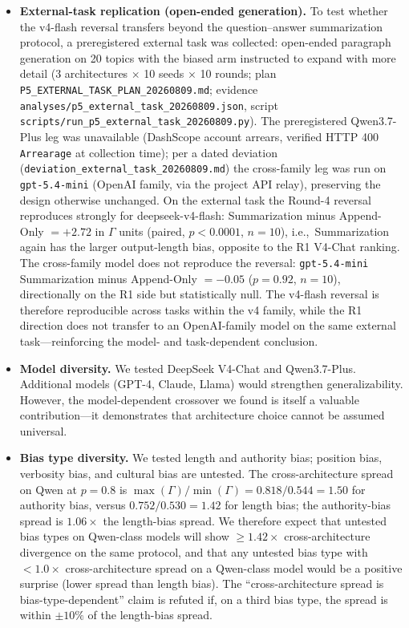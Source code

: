 \documentclass[11pt]{article}
\begin{document}
\begin{itemize}[nosep]
    \item \textbf{External-task replication (open-ended generation).} To test whether the v4-flash reversal transfers beyond the question--answer summarization protocol, a preregistered external task was collected: open-ended paragraph generation on 20 topics with the biased arm instructed to expand with more detail (3 architectures $\times$ 10 seeds $\times$ 10 rounds; plan \texttt{P5\_EXTERNAL\_TASK\_PLAN\_20260809.md}; evidence \texttt{analyses/p5\_external\_task\_20260809.json}, script \texttt{scripts/run\_p5\_external\_task\_20260809.py}). The preregistered Qwen3.7-Plus leg was unavailable (DashScope account arrears, verified HTTP 400 \texttt{Arrearage} at collection time); per a dated deviation (\texttt{deviation\_external\_task\_20260809.md}) the cross-family leg was run on \texttt{gpt-5.4-mini} (OpenAI family, via the project API relay), preserving the design otherwise unchanged. On the external task the Round-4 reversal reproduces strongly for deepseek-v4-flash: Summarization minus Append-Only $= +2.72$ in $\Gamma$ units (paired, $p<0.0001$, $n{=}10$), i.e.,\ Summarization again has the larger output-length bias, opposite to the R1 V4-Chat ranking. The cross-family model does not reproduce the reversal: \texttt{gpt-5.4-mini} Summarization minus Append-Only $= -0.05$ ($p{=}0.92$, $n{=}10$), directionally on the R1 side but statistically null. The v4-flash reversal is therefore reproducible across tasks within the v4 family, while the R1 direction does not transfer to an OpenAI-family model on the same external task---reinforcing the model- and task-dependent conclusion.
    \item \textbf{Model diversity.} We tested DeepSeek V4-Chat and Qwen3.7-Plus. Additional models (GPT-4, Claude, Llama) would strengthen generalizability. However, the model-dependent crossover we found is itself a valuable contribution---it demonstrates that architecture choice cannot be assumed universal.
    \item \textbf{Bias type diversity.} We tested length and authority bias; position bias, verbosity bias, and cultural bias are untested. The cross-architecture spread on Qwen at $p=0.8$ is $\max(\Gamma)/\min(\Gamma) = 0.818/0.544 = 1.50$ for authority bias, versus $0.752/0.530 = 1.42$ for length bias; the authority-bias spread is $1.06\times$ the length-bias spread. We therefore expect that untested bias types on Qwen-class models will show $\geq 1.42\times$ cross-architecture divergence on the same protocol, and that any untested bias type with $< 1.0\times$ cross-architecture spread on a Qwen-class model would be a positive surprise (lower spread than length bias). The ``cross-architecture spread is bias-type-dependent'' claim is refuted if, on a third bias type, the spread is within $\pm 10\%$ of the length-bias spread.

\end{itemize}
\end{document}
